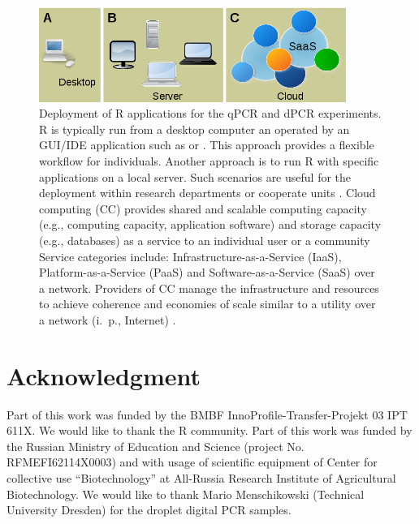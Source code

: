 \begin{figure}[htbp]
  \centering
  \includegraphics[clip=true, width=10cm]{figures/options.png}
  \caption{Deployment of R applications for the qPCR and dPCR experiments. 
 R is typically run from a desktop computer an operated by an 
GUI/IDE application such as  or . This approach 
provides a flexible workflow for individuals.  Another approach is 
to run R with specific applications on a local server. Such scenarios are 
useful 
for the deployment within research departments or cooperate units 
\citep{R_web}. 
 Cloud computing (CC) provides shared and scalable computing 
capacity (e.g., computing capacity, application software) and storage capacity 
(e.g., databases) as a service to an individual user or a community Service 
categories include: Infrastructure-as-a-Service (IaaS), Platform-as-a-Service 
(PaaS) and Software-as-a-Service (SaaS) over a network. Providers of CC manage 
the infrastructure and resources to achieve coherence and economies of scale 
similar to a utility over a network (i.~p., Internet) \citep{R_cloud}.}
  \label{figure:options}
\end{figure} 

\section{Acknowledgment}

Part of this work was funded by the BMBF InnoProfile-Transfer-Projekt 03 IPT 
611X. We would like to thank the R community. Part of this work was funded by 
the 
Russian Ministry of Education and Science (project No. RFMEFI62114X0003) and 
with usage of scientific equipment of Center for collective use 
``Biotechnology'' at All-Russia Research Institute of Agricultural 
Biotechnology. We would like to thank Mario Menschikowski (Technical University 
Dresden) for the droplet digital PCR samples.



\address{Stefan R\"odiger (corresponding author)\\
  Faculty of Natural Sciences\\
  Brandenburg University of Technology Cottbus--Senftenberg\\
  Senftenberg\\
  Germany}

